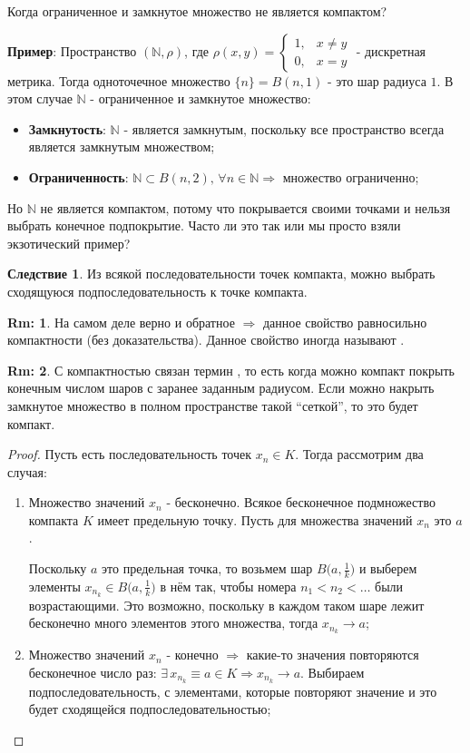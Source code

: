 \documentclass[12pt]{article}
\newcommand{\MN}{\mathbb{N}}
\theoremstyle{definition}
\newtheorem{rem}{Rm:}
\newtheorem{corollary}{Следствие}
\begin{document}
Когда ограниченное и замкнутое множество не является компактом?

\textbf{Пример}: Пространство $(\MN, \rho)$, где $\rho(x,y) = \begin{cases} 1, & x \neq y \\ 0, & x = y \end{cases}$ - дискретная метрика. Тогда одноточечное множество $\{n\} = B(n,1)$ - это шар радиуса $1$. В этом случае $\MN$ - ограниченное и замкнутое множество:
\begin{itemize}
	\item \textbf{Замкнутость}: $\MN$ - является замкнутым, поскольку все пространство всегда является замкнутым множеством;
	\item \textbf{Ограниченность}: $\MN \subset B(n,2), \, \forall n \in \MN \Rightarrow$ множество ограниченно;
\end{itemize}
Но $\MN$ не является компактом, потому что покрывается своими точками и нельзя выбрать конечное подпокрытие. Часто ли это так или мы просто взяли экзотический пример?

\begin{corollary}
	Из всякой последовательности точек компакта, можно выбрать сходящуюся подпоследовательность к точке компакта.
\end{corollary}
\begin{rem}
	На самом деле верно и обратное $\Rightarrow$ данное свойство равносильно компактности (без доказательства). Данное свойство иногда называют .
\end{rem}
\begin{rem}
	С компактностью связан термин , то есть когда можно компакт покрыть конечным числом шаров с заранее заданным радиусом. Если можно накрыть замкнутое множество в полном пространстве такой ``сеткой'', то это будет компакт.
\end{rem}
\begin{proof}
	Пусть есть последовательность точек $x_n \in K$. Тогда рассмотрим два случая:
	\begin{enumerate}[label ={(\arabic*)}]
		\item Множество значений $x_n$ - бесконечно. Всякое бесконечное подмножество компакта $K$ имеет предельную точку. Пусть для множества значений $x_n$ это $a$. 
		
		Поскольку $a$ это предельная точка, то возьмем шар $B\big(a,\tfrac{1}{k}\big)$ и выберем элементы $x_{n_k} \in B\big(a,\tfrac{1}{k}\big)$ в нём так, чтобы номера $n_1 < n_2 < \dotsc $ были возрастающими. Это возможно, поскольку в каждом таком шаре лежит бесконечно много элементов этого множества, тогда $x_{n_k} \to a$;
		
		\item Множество значений $x_n$ - конечно $\Rightarrow$ какие-то значения повторяются бесконечное число раз: $\exists \, x_{n_k} \equiv a \in K \Rightarrow x_{n_k} \to a$.
		Выбираем подпоследовательность, с элементами, которые повторяют значение и это будет сходящейся подпоследовательностью;
	\end{enumerate}
\end{proof}
\end{document}
